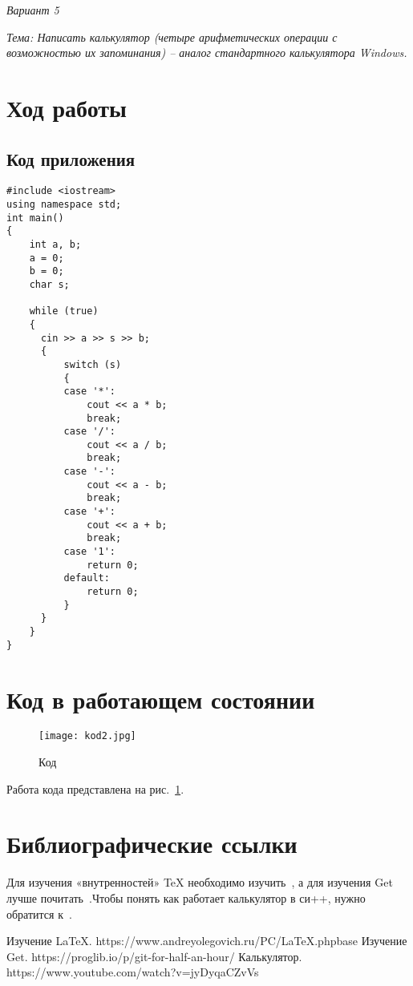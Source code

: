 \documentclass[12pt,a4paper]{scrartcl}
\begin{document}
{\LARGE \textit{Вариант 5}}\bigskip

{\LARGE \textit{Тема: Написать калькулятор (четыре арифметических операции с возможностью их запоминания) – аналог стандартного калькулятора Windows.}}
			
\section{Ход работы}
\label{sec:exp}

\subsection{Код приложения}
\label{sec:exp:code}
\begin{verbatim}
#include <iostream>
using namespace std;
int main()
{
    int a, b;
    a = 0;
    b = 0;
    char s;

    while (true) 
    {
      cin >> a >> s >> b;
      {
          switch (s)
          {
          case '*':
              cout << a * b;
              break;
          case '/':
              cout << a / b;
              break;
          case '-':
              cout << a - b;
              break;
          case '+':
              cout << a + b;
              break;
          case '1':
              return 0;
          default:
              return 0;
          }
      }
    }
}
\end{verbatim}


\section{Код в работающем состоянии}
\label{sec:picexample}
\begin{figure}[h]
	\centering
	\texttt{[image: kod2.jpg]}
	\caption{Код}\label{fig:par}
\end{figure}
Работа кода представлена на рис.~\ref{fig:par}.

\section{Библиографические ссылки}

Для изучения «внутренностей» \TeX{} необходимо 
изучить~\cite{andreyolegovich}, а для изучения Get лучше
почитать~\cite{proglib.io}.Чтобы понять как работает калькулятор в си++, нужно обратится к~\cite{youtube}. 

\begin{thebibliography}{9}
Изучение \LaTeX{}. https://www.andreyolegovich.ru/PC/LaTeX.phpbase
Изучение Get. https://proglib.io/p/git-for-half-an-hour/    
Калькулятор. https://www.youtube.com/watch?v=jyDyqaCZvVs
\end{thebibliography}
\end{document}
